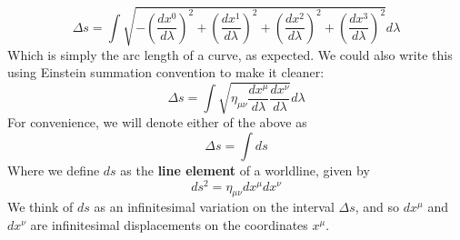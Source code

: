 \documentclass{article}
\begin{document}
 		\vspace{-1cm}
 		$$ \Delta s = \int \sqrt{ - \left(\frac{d x^0}{d \lambda}\right)^2 + \left(\frac{d x^1}{d \lambda}\right)^2 + \left(\frac{d x^2}{d \lambda}\right)^2 + \left(\frac{d x^3}{d \lambda}\right)^2} d \lambda$$ 
 		Which is simply the arc length of a curve, as expected. We could also write this using Einstein summation convention to make it cleaner:
 		$$ \Delta s = \int \sqrt{\eta_{\mu \nu} \frac{dx^\mu}{d\lambda} \frac{dx^\nu}{d\lambda}}d\lambda$$
 		For convenience, we will denote either of the above as
 		$$ \Delta s = \int ds$$Where we define $ds$ as the \textbf{line element} of a worldline, given by
 		\begin{equation}
 			\label{eq:LineElement}
 			\boxed{ds^2 = \eta_{\mu\nu} dx^\mu dx^\nu}
 		\end{equation}
 		We think of $ds$ as an infinitesimal variation on the interval $\Delta s$, and so $dx^\mu$ and $dx^\nu$ are infinitesimal displacements on the coordinates $x^\mu$.
 		
\end{document}
